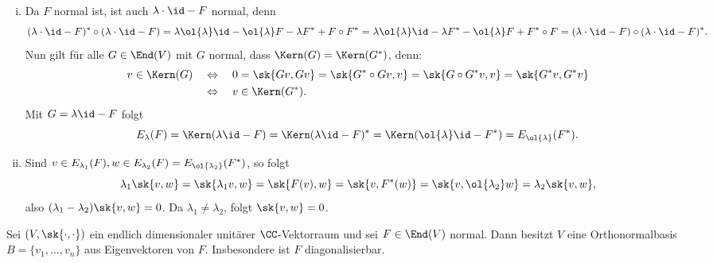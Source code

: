 \begin{beweis}
	\mbox{} \\[-.9cm]
	\begin{enumerate}[(i)]
		\item Da $F$ normal ist, ist auch $\lambda \cdot \id -F$ normal, denn
		\[
			(\lambda \cdot \id - F)^* \circ (\lambda \cdot \id - F) = \lambda \ol{\lambda} \id - \ol{\lambda} F - \lambda F^* + F \circ F^* = \lambda \ol{\lambda} \id - \lambda F^* - \ol{\lambda} F + F^* \circ F = (\lambda \cdot \id - F) \circ (\lambda \cdot \id - F)^*.
		\]
		Nun gilt für alle $G \in \End(V)$ mit $G$ normal, dass $\Kern(G) = \Kern(G^*)$, denn:
		\begin{align*}
			v \in \Kern(G) \quad &\Leftrightarrow \quad 0 = \sk{Gv,Gv} = \sk{G^* \circ Gv,v} = \sk{G \circ G^*v,v} = \sk{G^*v,G^*v} \\
			&\Leftrightarrow \quad v \in \Kern(G^*).
		\end{align*} 
		Mit $G = \lambda \id - F$ folgt
		\[
			E_\lambda(F) = \Kern(\lambda \id - F) = \Kern(\lambda \id - F)^* = \Kern(\ol{\lambda} \id - F^*) = E_{\ol{\lambda}}(F^*).
		\]
		\item Sind $v \in E_{\lambda_1}(F), w \in E_{\lambda_2}(F) = E_{\ol{\lambda_2}}(F^*)$, so folgt
		\[
			\lambda_1 \sk{v,w} = \sk{\lambda_1v,w} = \sk{F(v),w} = \sk{v,F^*(w)} = \sk{v,\ol{\lambda_2} w} = \lambda_2 \sk{v,w},
		\]
		also $(\lambda_1 - \lambda_2)\sk{v,w} = 0$.
		Da $\lambda_1 \neq \lambda_2$, folgt $\sk{v,w} = 0$. 
	\end{enumerate}
\end{beweis}

\begin{satz}
	\label{satz:7.3}
	Sei $(V,\sk{\cdot,\cdot})$ ein endlich dimensionaler unitärer $\CC$-Vektorraum und sei $F \in \End(V)$ normal.
	Dann besitzt $V$ eine Orthonormalbasis $B = \{v_1,\dots,v_n\}$ aus Eigenvektoren von $F$.
	Insbesondere ist $F$ diagonalisierbar.
\end{satz}

